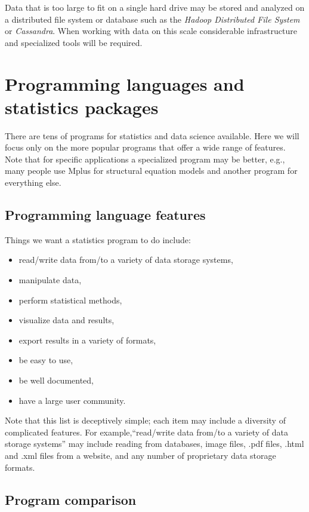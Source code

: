 \documentclass[]{book}
\providecommand{\tightlist}{%
  \setlength{\itemsep}{0pt}\setlength{\parskip}{0pt}}
\begin{document}
Data that is too large to fit on a single hard drive may be stored and
analyzed on a distributed file system or database such as the
\emph{Hadoop Distributed File System} or \emph{Cassandra}. When working
with data on this scale considerable infrastructure and specialized
tools will be required.

\section{Programming languages and statistics
packages}\label{programming-languages-and-statistics-packages}

There are tens of programs for statistics and data science available.
Here we will focus only on the more popular programs that offer a wide
range of features. Note that for specific applications a specialized
program may be better, e.g., many people use Mplus for structural
equation models and another program for everything else.

\subsection{Programming language
features}\label{programming-language-features}

Things we want a statistics program to do include:

\begin{itemize}
\tightlist
\item
  read/write data from/to a variety of data storage systems,
\item
  manipulate data,
\item
  perform statistical methods,
\item
  visualize data and results,
\item
  export results in a variety of formats,
\item
  be easy to use,
\item
  be well documented,
\item
  have a large user community.
\end{itemize}

Note that this list is deceptively simple; each item may include a
diversity of complicated features. For example,``read/write data from/to
a variety of data storage systems'' may include reading from databases,
image files, .pdf files, .html and .xml files from a website, and any
number of proprietary data storage formats.

\subsection{Program comparison}\label{program-comparison}
\end{document}
